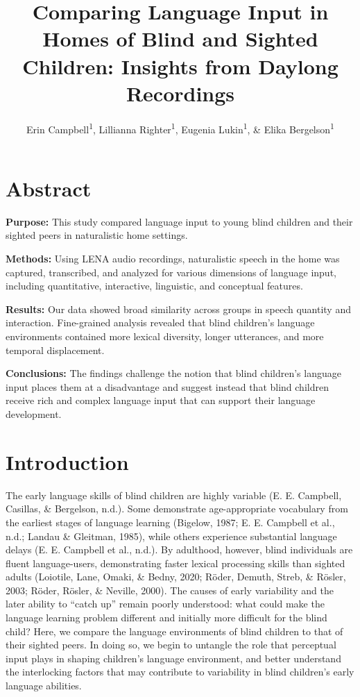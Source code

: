 \documentclass[
  man]{apa6}
\title{Comparing Language Input in Homes of Blind and Sighted Children: Insights from Daylong Recordings}
\author{Erin Campbell\textsuperscript{1}, Lillianna Righter\textsuperscript{1}, Eugenia Lukin\textsuperscript{1}, \& Elika Bergelson\textsuperscript{1}}
\date{}
\affiliation{\vspace{0.5cm}\textsuperscript{1} Department of Psychology \& Neuroscience, Duke University, Durham, NC}
\begin{document}
\maketitle

\hypertarget{abstract}{%
\section{Abstract}\label{abstract}}

\textbf{Purpose:} This study compared language input to young blind children and their sighted peers in naturalistic home settings.

\textbf{Methods:} Using LENA audio recordings, naturalistic speech in the home was captured, transcribed, and analyzed for various dimensions of language input, including quantitative, interactive, linguistic, and conceptual features.

\textbf{Results:} Our data showed broad similarity across groups in speech quantity and interaction. Fine-grained analysis revealed that blind children's language environments contained more lexical diversity, longer utterances, and more temporal displacement.

\textbf{Conclusions:} The findings challenge the notion that blind children's language input places them at a disadvantage and suggest instead that blind children receive rich and complex language input that can support their language development.

\hypertarget{introduction}{%
\section{Introduction}\label{introduction}}

The early language skills of blind children are highly variable (E. E. Campbell, Casillas, \& Bergelson, n.d.). Some demonstrate age-appropriate vocabulary from the earliest stages of language learning (Bigelow, 1987; E. E. Campbell et al., n.d.; Landau \& Gleitman, 1985), while others experience substantial language delays (E. E. Campbell et al., n.d.). By adulthood, however, blind individuals are fluent language-users, demonstrating faster lexical processing skills than sighted adults (Loiotile, Lane, Omaki, \& Bedny, 2020; Röder, Demuth, Streb, \& Rösler, 2003; Röder, Rösler, \& Neville, 2000). The causes of early variability and the later ability to ``catch up'' remain poorly understood: what could make the language learning problem different and initially more difficult for the blind child? Here, we compare the language environments of blind children to that of their sighted peers. In doing so, we begin to untangle the role that perceptual input plays in shaping children's language environment, and better understand the interlocking factors that may contribute to variability in blind children's early language abilities.
\end{document}
